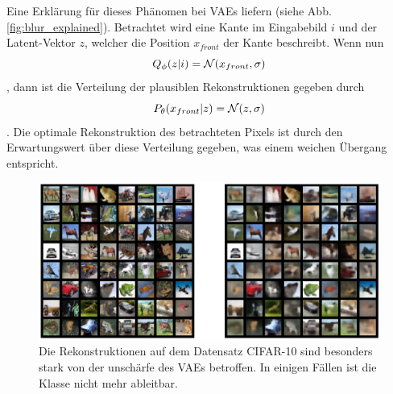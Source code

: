 Eine Erklärung für dieses Phänomen bei VAEs liefern \cite{Plumerault2020} (siehe Abb. \ref{fig:blur_explained}). Betrachtet wird eine Kante im Eingabebild $i$ und der Latent-Vektor $z$, welcher die Position $x_{front}$ der Kante beschreibt. Wenn nun 
\[
Q_\phi(z \vert i) = \mathcal{N}(x_{front}, \sigma)
\]
, dann ist die Verteilung der plausiblen Rekonstruktionen gegeben durch
\[
P_\theta(x_{front} \vert z) = \mathcal{N}(z, \sigma)
\]. Die optimale Rekonstruktion des betrachteten Pixels ist durch den Erwartungswert über diese Verteilung gegeben, was einem weichen Übergang entspricht.

\begin{figure}[hbt]
  \centering
  \includegraphics[width=\textwidth]{gfx/evaluation/cifar-10}
  \caption{Die Rekonstruktionen auf dem Datensatz CIFAR-10 sind besonders stark von der unschärfe des VAEs betroffen. In einigen Fällen ist die Klasse nicht mehr ableitbar.}
  \label{fig:cifar10-bad-recon}
\end{figure}


